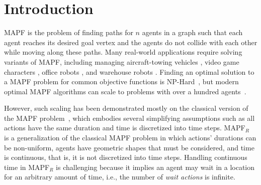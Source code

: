 \documentclass[letterpaper]{article} %
\newcommand{\mapfr}{{MAPF}$_R$\xspace}
\newcommand{\mapf}{\ac{MAPF}\xspace}
\begin{document}
\begin{abstract}

\end{abstract}

\section{Introduction}

\acf{MAPF} is the problem of finding paths for $n$ agents in a graph such that
each agent reaches its desired goal vertex and the agents do not collide with each other while moving along these paths.
Many real-world applications require solving variants of \mapf,
including managing aircraft-towing vehicles \cite{MorrisPLMMKK16}, video game characters \cite{Silver05}, office robots \cite{VelosoBCR15}, and warehouse robots \cite{WurmanDM07}.
Finding an optimal solution to a \mapf problem for common objective functions is NP-Hard~\cite{surynek2010optimization,yu2013structure},
but modern optimal \mapf algorithms can scale to problems with over a hundred agents~\cite{sharon2015conflict,BoyarskiFSSTBS15,felner2018adding,BCP,lazy-cbs,SurynekFSB16}.

However, such scaling has been demonstrated mostly on the classical version of the \mapf problem~\cite{stern2019multi}, which embodies several simplifying assumptions such as all actions have the same duration and time is discretized into time steps. \mapfr~\cite{walker2018extended} is a generalization of the classical \mapf problem in which actions' durations can be non-uniform, agents have geometric shapes that must be considered, and time is continuous, that is, it is not discretized into time steps.
Handling continuous time in \mapfr is challenging because it implies an agent may wait in a location for an arbitrary amount of time, i.e., the number of \emph{wait actions} is infinite.
\end{document}
